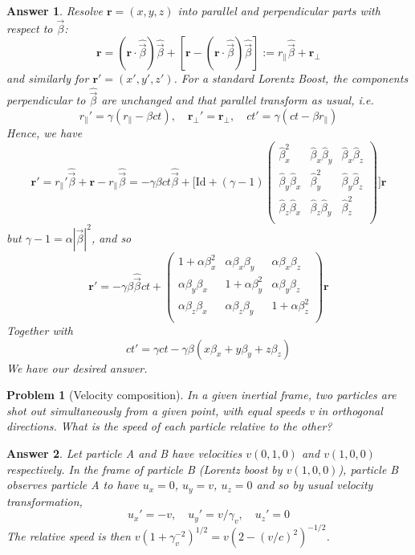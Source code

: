\documentclass[a4paper]{article}
\newtheorem{ans}{Answer}[subsection]
\theoremstyle{new}
\newtheorem{qns}{Problem}[section]
\begin{document}
\begin{ans}
Resolve $\mathbf{r}=(x,y,z)$ into parallel and perpendicular parts with respect to $\vec{\beta}$:
$$\mathbf{r}=(\mathbf{r}\cdot\hat{\vec{\beta}})\hat{\vec{\beta}}+[\mathbf{r}-(\mathbf{r}\cdot\hat{\vec{\beta}})\hat{\vec{\beta}}]:=r_\parallel\hat{\vec{\beta}}+\mathbf{r_{\perp}}$$
and similarly for $\mathbf{r'}=(x',y',z')$. For a standard Lorentz Boost, the components perpendicular to $\hat{\vec{\beta}}$ are unchanged and that parallel transform as usual, i.e.
$$r_\parallel'=\gamma(r_\parallel-\beta ct),\quad\mathbf{r_\perp'}=\mathbf{r_{\perp}},\quad ct'=\gamma(ct-\beta r_\parallel)$$
Hence, we have
$$\mathbf{r'}=r_\parallel'\hat{\vec{\beta}}+\mathbf{r}-r_\parallel\hat{\vec{\beta}}=-\gamma\beta ct\hat{\vec{\beta}}+\bigg[\text{Id}+(\gamma-1)
\begin{pmatrix}\hat{\beta}_x^2&\hat{\beta}_x\hat{\beta}_y&\hat{\beta}_x\hat{\beta}_z\\
\hat{\beta}_y\hat{\beta}_x&\hat{\beta}_y^2&\hat{\beta}_y\hat{\beta}_z\\
\hat{\beta}_z\hat{\beta}_x&\hat{\beta}_z\hat{\beta}_y&\hat{\beta}_z^2\\\end{pmatrix}\bigg]\mathbf{r}$$
but $\gamma-1=\alpha|\vec{\beta}|^2$, and so
$$\mathbf{r'}=-\gamma\beta \hat{\vec{\beta}}ct+\begin{pmatrix}1+\alpha\beta_x^2&\alpha\beta_x\beta_y&\alpha\beta_x\beta_z\\\alpha\beta_y\beta_x&1+\alpha\beta_y^2&\alpha\beta_y\beta_z\\\alpha\beta_z\beta_x&\alpha\beta_z\beta_y&1+\alpha\beta_z^2\\\end{pmatrix}\mathbf{r}$$
Together with
$$ct'=\gamma ct-\gamma\beta(x\beta_x+y\beta_y+z\beta_z)$$
We have our desired answer.
\end{ans}
\begin{qns}[Velocity composition]
In a given inertial frame, two particles are shot out simultaneously from a given
point, with equal speeds v in orthogonal directions. What is the speed of each particle
relative to the other?
\end{qns}
\begin{ans}
Let particle A and B have velocities $v(0,1,0)$ and $v(1,0,0)$ respectively. In the frame of particle B (Lorentz boost by $v(1,0,0)$), particle B observes particle A to have $u_x=0$, $u_y=v$, $u_z=0$ and so by usual velocity transformation,
$$u_x'=-v,\quad u_y'=v/\gamma_v,\quad u_z'=0$$
The relative speed is then $v(1+\gamma_v^{-2})^{1/2}=v(2-(v/c)^2)^{-1/2}$.
\end{ans}
\end{document}
